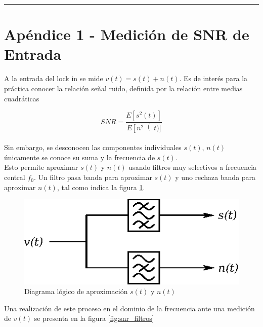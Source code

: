 \documentclass[11pt,a4paper]{extarticle}
\begin{document}
\newpage
\begin{appendices}
\vspace{-1em}
\hrule
\vspace{1em}
\normalsize
\section{Apéndice 1 - Medición de SNR de Entrada}
\end{appendices}

\begin{multicols}{2}
\normalsize
A la entrada del lock in se mide $v(t) = s(t) + n(t)$. Es de interés para la práctica conocer la relación señal ruido, definida por la relación entre medias cuadráticas

\begin{equation}\label{eq:snr}
	SNR = \frac{E\left[s^2(t)\right]}{E\left[n^2\right(t)]}
\end{equation}\\[-1em]

Sin embargo, se desconocen las componentes individuales $s(t)$, $n(t)$ únicamente se conoce su suma y la frecuencia de $s(t)$.\\

Esto permite aproximar $s(t)$ y $n(t)$ usando filtros muy selectivos a frecuencia central $f_0$. Un filtro pasa banda para aproximar $s(t)$ y uno rechaza banda para aproximar $n(t)$, tal como indica la figura \ref{fig:circ_snr}.

\begin{figure}[H]
	\centering
	\includegraphics[width=0.75\linewidth]{Images/circ_snr.eps}
	\caption{Diagrama lógico de aproximación $s(t)$ y $n(t)$}
	\label{fig:circ_snr}
\end{figure}

Una realización de este proceso en el dominio de la frecuencia ante una medición de $v(t)$ se presenta en la figura \ref{fig:snr_filtros}


\end{multicols}
\end{document}
